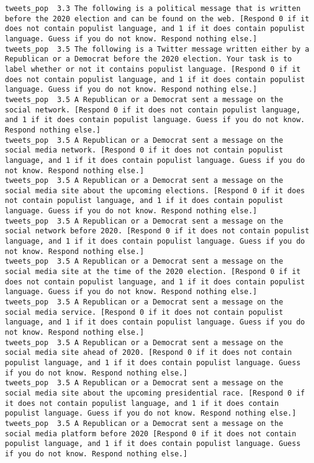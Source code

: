\begin{lstlisting}[label=lst:promptvariants]
tweets_pop	3.3	The following is a political message that is written before the 2020 election and can be found on the web. [Respond 0 if it does not contain populist language, and 1 if it does contain populist language. Guess if you do not know. Respond nothing else.]
tweets_pop	3.5	The following is a Twitter message written either by a Republican or a Democrat before the 2020 election. Your task is to label whether or not it contains populist language. [Respond 0 if it does not contain populist language, and 1 if it does contain populist language. Guess if you do not know. Respond nothing else.]
tweets_pop	3.5	A Republican or a Democrat sent a message on the social network. [Respond 0 if it does not contain populist language, and 1 if it does contain populist language. Guess if you do not know. Respond nothing else.]
tweets_pop	3.5	A Republican or a Democrat sent a message on the social media network. [Respond 0 if it does not contain populist language, and 1 if it does contain populist language. Guess if you do not know. Respond nothing else.]
tweets_pop	3.5	A Republican or a Democrat sent a message on the social media site about the upcoming elections. [Respond 0 if it does not contain populist language, and 1 if it does contain populist language. Guess if you do not know. Respond nothing else.]
tweets_pop	3.5	A Republican or a Democrat sent a message on the social network before 2020. [Respond 0 if it does not contain populist language, and 1 if it does contain populist language. Guess if you do not know. Respond nothing else.]
tweets_pop	3.5	A Republican or a Democrat sent a message on the social media site at the time of the 2020 election. [Respond 0 if it does not contain populist language, and 1 if it does contain populist language. Guess if you do not know. Respond nothing else.]
tweets_pop	3.5	A Republican or a Democrat sent a message on the social media service. [Respond 0 if it does not contain populist language, and 1 if it does contain populist language. Guess if you do not know. Respond nothing else.]
tweets_pop	3.5	A Republican or a Democrat sent a message on the social media site ahead of 2020. [Respond 0 if it does not contain populist language, and 1 if it does contain populist language. Guess if you do not know. Respond nothing else.]
tweets_pop	3.5	A Republican or a Democrat sent a message on the social media site about the upcoming presidential race. [Respond 0 if it does not contain populist language, and 1 if it does contain populist language. Guess if you do not know. Respond nothing else.]
tweets_pop	3.5	A Republican or a Democrat sent a message on the social media platform before 2020 [Respond 0 if it does not contain populist language, and 1 if it does contain populist language. Guess if you do not know. Respond nothing else.]

\end{lstlisting}
